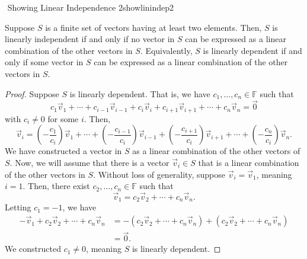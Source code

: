         \begin{theorem}{\Stop\,\,Showing Linear Independence 2}{showlinindep2}
            
            Suppose \(S\) is a finite set of vectors having at least two elements. Then, \(S\) is linearly independent if and only if no vector in \(S\) can be expressed as a linear combination of the other vectors in \(S\). Equivalently, \(S\) is linearly dependent if and only if some vector in \(S\) can be expressed as a linear combination of the other vectors in \(S\).
            \begin{proof}
                Suppose \(S\) is linearly dependent. That is, we have \(c_1,\ldots,c_n\in\mathbb{F}\) such that
                \begin{equation*}
                    c_1\vec{v}_1+\cdots+c_{i-1}\vec{v}_{i-1}+c_i\vec{v}_i+c_{i+1}\vec{v}_{i+1}+\cdots+c_n\vec{v}_n=\vec{0}
                \end{equation*}
                with \(c_i\neq0\) for some \(i\). Then,
                \begin{equation*}
                    \vec{v}_i=\left(-\frac{c_1}{c_i}\right)\vec{v}_1+\cdots+\left(-\frac{c_{i-1}}{c_i}\right)\vec{v}_{i-1}+\left(-\frac{c_{i+1}}{c_i}\right)\vec{v}_{i+1}+\cdots+\left(-\frac{c_n}{c_i}\right)\vec{v}_n.
                \end{equation*}
                We have constructed a vector in \(S\) as a linear combination of the other vectors of \(S\). Now, we will assume that there is a vector \(\vec{v}_i\in S\) that is a linear combination of the other vectors in \(S\). Without loss of generality, suppose \(\vec{v}_i=\vec{v}_1\), meaning \(i=1\). Then, there exist \(c_2,\ldots,c_n\in\mathbb{F}\) such that
                \begin{equation*}
                    \vec{v}_1=c_2\vec{v}_2+\cdots+c_n\vec{v}_n.
                \end{equation*}
                Letting \(c_1=-1\), we have
                \begin{align*}
                    -\vec{v}_1+c_2\vec{v}_2+\cdots+c_n\vec{v}_n&=-(c_2\vec{v}_2+\cdots+c_n\vec{v}_n)+(c_2\vec{v}_2+\cdots+c_n\vec{v}_n) \\
                    &=\vec{0}.
                \end{align*}
                We constructed \(c_1\neq0\), meaning \(S\) is linearly dependent.
            \end{proof}
        \end{theorem}
